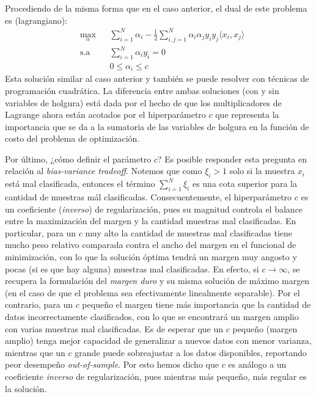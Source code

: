 Procediendo de la misma forma que en el caso anterior, el dual de este problema es (lagrangiano):
\begin{equation*}
\begin{aligned}
& \underset{\alpha}{\text{max}}
& & \sum\limits_{i=1}^{N}\alpha_i - \frac{1}{2} \sum\limits_{i,j=1}^{N} \alpha_i \alpha_j y_i y_j \langle x_i, x_j\rangle\\
& \text{s.a}
& & \sum\limits_{i=1}^{N} \alpha_i y_i= 0 \\
& &  &0 \leq \alpha_i \leq c
\end{aligned}
\end{equation*}
Esta solución similar al caso anterior y también se puede resolver con técnicas de programación cuadrática. La diferencia entre ambas soluciones (con y sin variables de holgura) está dada por el hecho de que los multiplicadores de Lagrange ahora están acotados por el hiperparámetro $c$ que representa la importancia que se da a la sumatoria de las variables de holgura en la función de costo del problema de optimización.

Por último, ¿cómo definir el parámetro $c$? Es posible responder esta pregunta en relación al \textit{bias-variance tradeoff}. Notemos que como $\xi_i>1$ solo si la muestra $x_i$ está mal clasificada, entonces el término $\sum\limits_{i=1}^{N} \xi_i$ es una cota superior para la cantidad de muestras mál clasificadas. Consecuentemente, el hiperparámetro $c$ es un coeficiente (\emph{inverso}) de regularización, pues su magnitud controla el balance entre la maximización del margen y la cantidad muestras mal clasificadas. En particular, para un $c$ muy alto la cantidad de muestras mal clasificadas tiene mucho peso relativo comparada contra el ancho del margen en el funcional de minimización, con lo que la solución óptima tendrá un margen muy angosto y pocas (si es que hay alguna) muestras mal clasificadas. En efecto, si $c\to\infty$, se recupera la formulación del \emph{margen duro} y su misma solución de máximo margen (en el caso de que el problema sea efectivamente linealmente separable). Por el contrario, para un $c$ pequeño el margen tiene más importancia que la cantidad de datos incorrectamente clasificados, con lo que se encontrará un margen amplio con varias muestras mal clasificadas. Es de esperar que un $c$ pequeño (margen amplio) tenga mejor capacidad de generalizar a nuevos datos con menor varianza, mientras que un $c$ grande puede sobreajustar a los datos disponibles, reportando peor desempeño \emph{out-of-sample}. Por esto hemos dicho que $c$ es análogo a un coeficiente \emph{inverso} de regularización, pues mientras más pequeño, más regular es la solución. 

